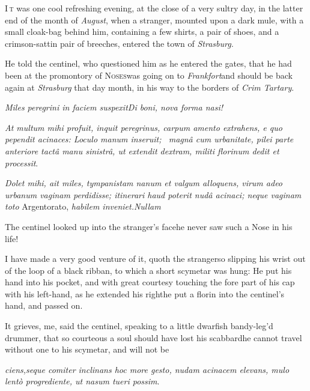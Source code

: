 \documentclass{article}
\begin{document}
\lettrine{I}{\,t} was one cool refreshing evening,
at the close of a very sultry day, in the latter end of the month
of \textit{August}, when a stranger, mounted upon a dark mule, with a
small cloak-bag behind him, containing a few shirts, a pair of
shoes, and a crimson-sattin pair of breeches, entered the town of
\textit{Strasburg.}

He told the centinel, who questioned him as he entered the
gates, that he had been at the promontory of
\textsc{Noses}\tsk was going on to
\textit{Frankfort}\tsh and should be back again at
\textit{Strasburg} that day month, in his way to the borders of
\textit{Crim Tartary}.

\newpage
\pagestyle{fancy}
\textit{Miles peregrini in faciem suspexit\tsh Di boni, nova
forma nasi!}

\vspace{20pt}

\textit{At multum mihi profuit, inquit peregrinus, carpum amento
extrahens, e quo pependit acinaces: Loculo manum inse\-ruit; \et\ magnâ cum
urbanitate, pilei parte anteriore tactâ manu sinistrâ,
ut extendit dextram, militi florinum dedit et processit}.

\vspace{40pt}

\textit{Dolet mihi, ait miles, tympanistam na\-num et valgum alloquens,
virum adeo urbanum vaginam perdidisse; itinerari haud poterit
nudâ acinaci; neque vaginam toto} Argentorato, \textit{habilem
inveniet.\tsh Nullam 
}

\newpage
The centinel looked up into the stran\-ger’s
face\tsh he never saw such a Nose in his life!


\tsk I have made a very good venture of it, quoth the
stranger\tsk so slipping his wrist out of the loop of a black
ribban, to which a short scymetar was hung: He put his hand
into his pocket, and with great courtesy touching the fore part of
his cap with his left-hand, as he extended his
right\tsk he put a florin into the centinel’s hand,
and passed on.

It grieves, me, said the centinel, speaking to a little dwarfish
bandy-leg’d drummer, that so courteous a soul should have
lost his scabbard\tsk he cannot travel without one to his
scymetar, and will not be\break
{}

\newpage
\noindent
\textit{ciens,\tsk seque comiter inclinans \tsk hoc more
gesto, nudam acinacem elevans, mulo lentò progrediente, ut
nasum tueri possim}.
\end{document}
